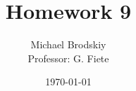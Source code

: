 


\title{Homework 9}
\date{\today}
\author{Michael Brodskiy\\ \small Professor: G. Fiete}



\maketitle

